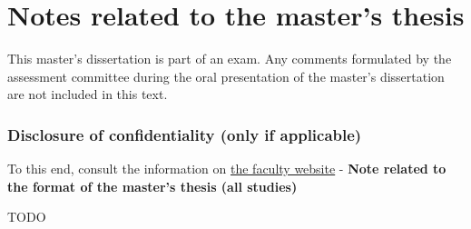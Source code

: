 \chapter*{Notes related to the master's thesis}

This master's dissertation is part of an exam. Any comments formulated by the assessment committee during the oral presentation of the master's dissertation are not included in this text.

\subsection*{Disclosure of confidentiality (only if applicable)}

To this end, consult the information on \href{https://www.ugent.be/ea/nl/faculteit/studentenadministratie/masterproef/} {the faculty website} - \textbf{Note related to the format of the master's thesis (all studies)}

TODO %